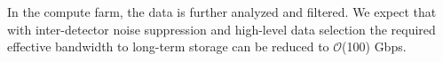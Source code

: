 In the compute farm, the data is further analyzed and filtered. We expect that with inter-detector noise suppression and high-level data selection the required effective bandwidth to long-term storage can be reduced to $\mathcal{O}$(100) Gbps.  






